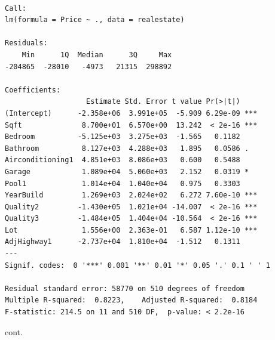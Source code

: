 \documentclass[]{article}
\begin{document}
\begin{verbatim}

Call:
lm(formula = Price ~ ., data = realestate)

Residuals:
    Min      1Q  Median      3Q     Max 
-204865  -28010   -4973   21315  298892 

Coefficients:
                   Estimate Std. Error t value Pr(>|t|)    
(Intercept)      -2.358e+06  3.991e+05  -5.909 6.29e-09 ***
Sqft              8.700e+01  6.570e+00  13.242  < 2e-16 ***
Bedroom          -5.125e+03  3.275e+03  -1.565   0.1182    
Bathroom          8.127e+03  4.288e+03   1.895   0.0586 .  
Airconditioning1  4.851e+03  8.086e+03   0.600   0.5488    
Garage            1.089e+04  5.060e+03   2.152   0.0319 *  
Pool1             1.014e+04  1.040e+04   0.975   0.3303    
YearBuild         1.269e+03  2.024e+02   6.272 7.60e-10 ***
Quality2         -1.430e+05  1.021e+04 -14.007  < 2e-16 ***
Quality3         -1.484e+05  1.404e+04 -10.564  < 2e-16 ***
Lot               1.556e+00  2.363e-01   6.587 1.12e-10 ***
AdjHighway1      -2.737e+04  1.810e+04  -1.512   0.1311    
---
Signif. codes:  0 '***' 0.001 '**' 0.01 '*' 0.05 '.' 0.1 ' ' 1

Residual standard error: 58770 on 510 degrees of freedom
Multiple R-squared:  0.8223,    Adjusted R-squared:  0.8184 
F-statistic: 214.5 on 11 and 510 DF,  p-value: < 2.2e-16
\end{verbatim}

\newpage

cont.
\end{document}
